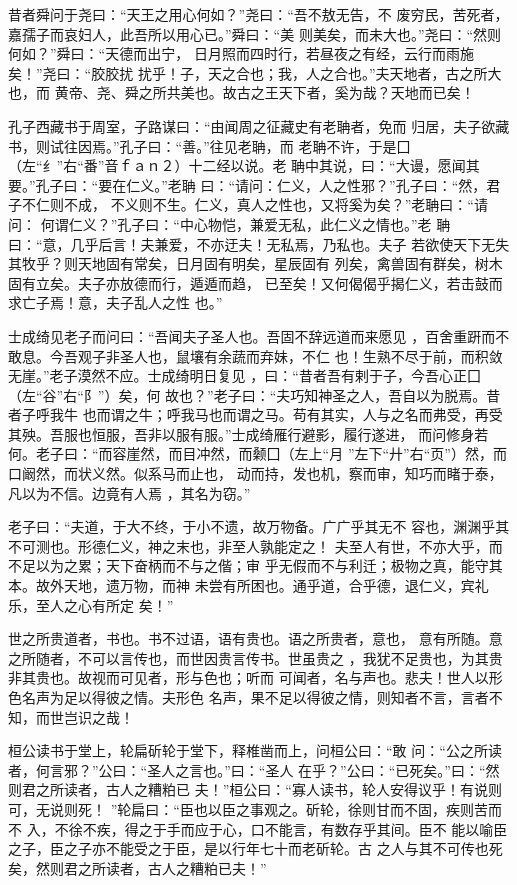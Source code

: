 \documentclass[]{article}
\begin{document}
昔者舜问于尧曰：``天王之用心何如？''尧曰：``吾不敖无告，不
废穷民，苦死者，嘉孺子而哀妇人，此吾所以用心已。''舜曰：``美
则美矣，而未大也。''尧曰：``然则何如？''舜曰：``天德而出宁，
日月照而四时行，若昼夜之有经，云行而雨施矣！''尧曰：``胶胶扰
扰乎！子，天之合也；我，人之合也。''夫天地者，古之所大也，而
黄帝、尧、舜之所共美也。故古之王天下者，奚为哉？天地而已矣！

孔子西藏书于周室，子路谋曰：``由闻周之征藏史有老聃者，免而
归居，夫子欲藏书，则试往因焉。''孔子曰：``善。''往见老聃，而
老聃不许，于是囗（左``纟''右``番''音ｆａｎ２）十二经以说。老
聃中其说，曰：``大谩，愿闻其要。''孔子曰：``要在仁义。''老聃
曰：``请问：仁义，人之性邪？''孔子曰：``然，君子不仁则不成，
不义则不生。仁义，真人之性也，又将奚为矣？''老聃曰：``请问：
何谓仁义？''孔子曰：``中心物恺，兼爱无私，此仁义之情也。''老
聃曰：``意，几乎后言！夫兼爱，不亦迂夫！无私焉，乃私也。夫子
若欲使天下无失其牧乎？则天地固有常矣，日月固有明矣，星辰固有
列矣，禽兽固有群矣，树木固有立矣。夫子亦放德而行，遁遁而趋，
已至矣！又何偈偈乎揭仁义，若击鼓而求亡子焉！意，夫子乱人之性 也。''

士成绮见老子而问曰：``吾闻夫子圣人也。吾固不辞远道而来愿见
，百舍重趼而不敢息。今吾观子非圣人也，鼠壤有余蔬而弃妹，不仁
也！生熟不尽于前，而积敛无崖。''老子漠然不应。士成绮明日复见
，曰：``昔者吾有剌于子，今吾心正囗（左``谷''右``阝''）矣，何
故也？''老子曰：``夫巧知神圣之人，吾自以为脱焉。昔者子呼我牛
也而谓之牛；呼我马也而谓之马。苟有其实，人与之名而弗受，再受
其殃。吾服也恒服，吾非以服有服。''士成绮雁行避影，履行遂进，
而问修身若何。老子曰：``而容崖然，而目冲然，而颡囗（左上``月
''左下``廾''右``页''）然，而口阚然，而状义然。似系马而止也，
动而持，发也机，察而审，知巧而睹于泰，凡以为不信。边竟有人焉
，其名为窃。''

老子曰：``夫道，于大不终，于小不遗，故万物备。广广乎其无不
容也，渊渊乎其不可测也。形德仁义，神之末也，非至人孰能定之！
夫至人有世，不亦大乎，而不足以为之累；天下奋柄而不与之偕；审
乎无假而不与利迁；极物之真，能守其本。故外天地，遗万物，而神
未尝有所困也。通乎道，合乎德，退仁义，宾礼乐，至人之心有所定 矣！''

世之所贵道者，书也。书不过语，语有贵也。语之所贵者，意也，
意有所随。意之所随者，不可以言传也，而世因贵言传书。世虽贵之
，我犹不足贵也，为其贵非其贵也。故视而可见者，形与色也；听而
可闻者，名与声也。悲夫！世人以形色名声为足以得彼之情。夫形色
名声，果不足以得彼之情，则知者不言，言者不知，而世岂识之哉！

桓公读书于堂上，轮扁斫轮于堂下，释椎凿而上，问桓公曰：``敢
问：``公之所读者，何言邪？''公曰：``圣人之言也。''曰：``圣人
在乎？''公曰：``已死矣。''曰：``然则君之所读者，古人之糟粕已
夫！''桓公曰：``寡人读书，轮人安得议乎！有说则可，无说则死！
''轮扁曰：``臣也以臣之事观之。斫轮，徐则甘而不固，疾则苦而不
入，不徐不疾，得之于手而应于心，口不能言，有数存乎其间。臣不
能以喻臣之子，臣之子亦不能受之于臣，是以行年七十而老斫轮。古
之人与其不可传也死矣，然则君之所读者，古人之糟粕已夫！''
\end{document}
